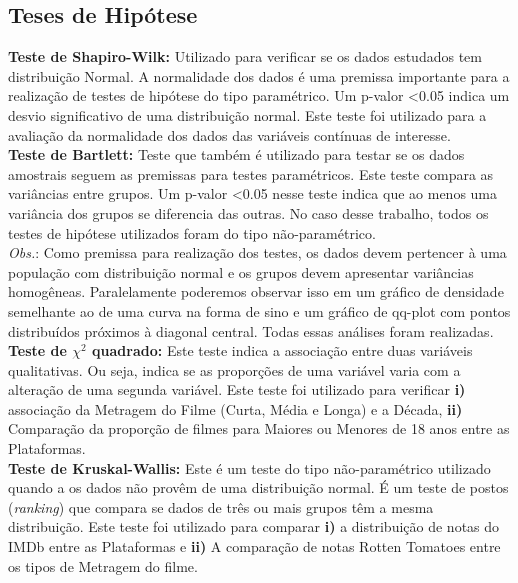 \documentclass[a4paper, 12pt]{article} %
\begin{document}
\subsection{Teses de Hipótese}

\textbf{Teste de Shapiro-Wilk:} Utilizado para verificar se os dados estudados tem distribuição Normal. A normalidade dos dados é uma premissa importante para a realização de testes de hipótese do tipo paramétrico. Um p-valor <0.05 indica um desvio significativo de uma distribuição normal. Este teste foi utilizado para a avaliação da normalidade dos dados das variáveis contínuas de interesse.\\

\textbf{Teste de Bartlett:} Teste que também é utilizado para testar se os dados amostrais seguem as premissas para testes paramétricos. Este teste compara as variâncias entre grupos. Um p-valor <0.05 nesse teste indica que ao menos uma variância dos grupos se diferencia das outras. No caso desse trabalho, todos os testes de hipótese utilizados foram do tipo não-paramétrico.\\

\emph{Obs.}: Como premissa para realização dos testes, os dados devem pertencer à uma população com distribuição normal e os grupos devem apresentar variâncias homogêneas. Paralelamente poderemos observar isso em um gráfico de densidade semelhante ao de uma curva na forma de sino e um gráfico de qq-plot com pontos distribuídos próximos à diagonal central. Todas essas análises foram realizadas.\\

\textbf{ Teste de $\chi^2$ quadrado:} Este teste indica a associação entre duas variáveis qualitativas. Ou seja, indica se as proporções de uma variável varia com a alteração de uma segunda variável. Este teste foi utilizado para verificar \textbf{i)} associação da Metragem do Filme (Curta, Média e Longa) e a Década, \textbf{ii)} Comparação da proporção de filmes para Maiores ou Menores de 18 anos entre as Plataformas. \\

\textbf{Teste de Kruskal-Wallis:} Este é um teste do tipo não-paramétrico utilizado quando a os dados não provêm de uma distribuição normal. É um teste de postos (\emph{ranking}) que compara se dados de três ou mais grupos têm a mesma distribuição. Este teste foi utilizado para comparar \textbf{i)}  a distribuição de notas do IMDb entre as Plataformas e \textbf{ii)} A comparação de notas Rotten Tomatoes entre os tipos de Metragem do filme. \\
\end{document}

